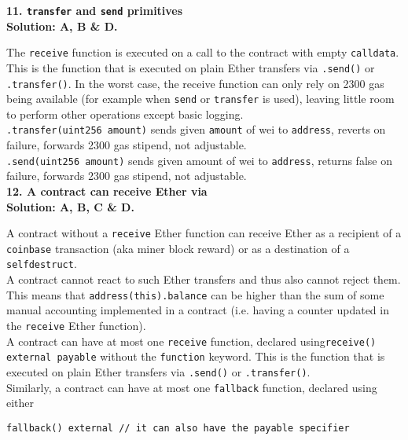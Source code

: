 \textbf{11. \texttt{transfer} and \texttt{send} primitives}\label{sec:exam2_q11}\\

\textbf{Solution: A, B \& D.}

The \verb|receive| function is executed on a call to the contract with empty \verb|calldata|.
This is the function that is executed on plain Ether transfers via \verb|.send()| or \verb|.transfer()|.
In the worst case, the receive function can only rely on 2300 gas being available (for example when \verb|send| or \verb|transfer| is used), leaving little room to perform other operations except basic logging.\\

\verb|.transfer(uint256 amount)| sends given \verb|amount| of wei to \verb|address|, reverts on failure, forwards 2300 gas stipend, not adjustable.\\

\verb|.send(uint256 amount)| sends given amount of wei to \verb|address|, returns false on failure, forwards 2300 gas stipend, not adjustable.\\

\textbf{12. A contract can receive Ether via}\label{sec:exam2_q12}\\

\textbf{Solution: A, B, C \& D.}

A contract without a \verb|receive| Ether function can receive Ether as a recipient of a \verb|coinbase| transaction (aka miner block reward) or as a destination of a \verb|selfdestruct|.\\

A contract cannot react to such Ether transfers and thus also cannot reject them.
This means that \verb|address(this).balance| can be higher than the sum of some manual accounting implemented in a contract (i.e. having a counter updated in the \verb|receive| Ether function).\\

A contract can have at most one \verb|receive| function, declared using\linebreak\verb|receive() external payable| without the \verb|function| keyword.
This is the function that is executed on plain Ether transfers via \verb|.send()| or \verb|.transfer()|.\\

Similarly, a contract can have at most one \verb|fallback| function, declared using either
\begin{lstlisting}[language=Solidity, style=solStyle]
fallback() external // it can also have the payable specifier
\end{lstlisting}

